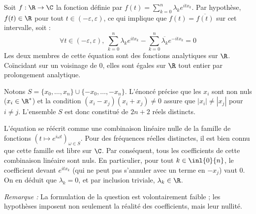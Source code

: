 \begin{solution}
    Soit $f:\R\to\C$ la fonction définie par $f(t)=\sum_{k=0}^n\lambda_ke^{itx_k}$. 
    Par hypothèse, $f(t)\in\R$ pour tout $t\in(-\varepsilon,\varepsilon)$, ce qui implique que $f(t) = \overline{f(t)}$ sur cet intervalle, soit :
    \[
        \forall t\in(-\varepsilon,\varepsilon),\ \sum_{k=0}^n\lambda_ke^{itx_k} - \sum_{k=0}^n\overline{\lambda_k}e^{-itx_k} = 0
    \]
    Les deux membres de cette équation sont des fonctions analytiques sur $\R$. Coïncidant sur un voisinage de $0$, elles sont égales sur $\R$ tout entier par prolongement analytique.
    
    Notons $S = \{x_0,\dots,x_n\} \cup \{-x_0,\dots,-x_n\}$. L'énoncé précise que les $x_i$ sont non nuls ($x_i \in \R^*$) et la condition $(x_i-x_j)(x_i+x_j)\neq 0$ assure que $|x_i| \neq |x_j|$ pour $i \neq j$. 
    L'ensemble $S$ est donc constitué de $2n+2$ réels distincts.
    
    L'équation se réécrit comme une combinaison linéaire nulle de la famille de fonctions $(t\mapsto e^{i\omega t})_{\omega\in S}$. 
    Pour des fréquences réelles distinctes, il est bien connu que cette famille est libre sur $\C$. 
    Par conséquent, tous les coefficients de cette combinaison linéaire sont nuls. En particulier, pour tout $k\in\inl{0}{n}$, le coefficient devant $e^{itx_k}$ (qui ne peut pas s'annuler avec un terme en $-x_j$) vaut $0$.
    On en déduit que $\lambda_k = 0$, et par inclusion triviale, $\lambda_k \in \R$.
    
    \textit{Remarque :} La formulation de la question est volontairement faible ; les hypothèses imposent non seulement la réalité des coefficients, mais leur nullité.
\end{solution}

